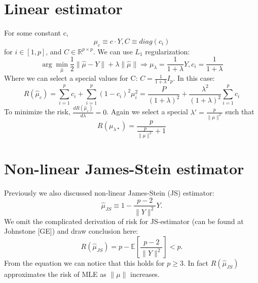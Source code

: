 \documentclass[twoside]{article}
\theoremstyle{definition}
\theoremstyle{definition}
\theoremstyle{remark}
\begin{document}
\section{Linear estimator}
For some constant c, $$\mu_c \equiv c \cdot Y, C \equiv diag(c_i)$$ for $i \in [1,p]$, and $C \in \mathbb{R}^{p \times p}$. We can use $L_1$ regularization: $$ \arg\min_{\hat\mu} \frac{1}{2} \| \hat\mu - Y \| + \lambda \| \hat\mu \| \Rightarrow \mu_\lambda = \frac{1}{1+\lambda}Y, c_i = \frac{1}{1+\lambda}$$
Where we can select a special values for C: $C=\frac{1}{1+\lambda}I_p$. In this case: \begin{equation} 
R(\hat\mu_c) = \sum_{i=1}^{p}c_i + \sum_{i=1}^{p}(1-c_i)^2\mu_i^2 = \frac{P}{(1+\lambda)^2}+\frac{\lambda^2}{(1+\lambda)^2}\sum_{i=1}^{p}c_i
\end{equation}
To minimize the risk, $\frac{dR(\hat\mu_c)}{d\lambda} = 0$. Again we select a special $\lambda' = \frac{p}{\|\mu\|^2}$ such that $$
R(\mu_{\lambda*}) = \frac{p}{\frac{p}{\| \mu \|^2} + 1}$$

\section{Non-linear James-Stein estimator}
Previously we also discussed non-linear James-Stein (JS) estimator: \begin{equation}
\hat\mu_{JS} \equiv 1-\frac{p-2}{\|Y\|^2}Y.
\end{equation}
We omit the complicated derivation of risk for JS-estimator (can be found at Johnstone [GE]) and draw conclusion here:
\begin{equation}
R(\hat\mu_{JS}) = p - \mathbb{E}[\frac{p-2}{\|Y\|^2}] < p.
\end{equation}
From the equation we can notice that this holds for $p \ge 3$. In fact $R(\hat\mu_{JS})$ approximates the risk of MLE as $\| \mu \|$ increases.
\end{document}
